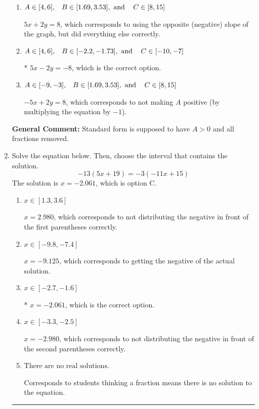 \documentclass{extbook}[14pt]
\newcommand{\litem}[1]{\item #1

\rule{\textwidth}{0.4pt}}
\begin{document}
\begin{enumerate}
{\begin{enumerate}[label=\Alph*.]
 $-2.5x - 1y = -4.0$, which corresponds to using the opposite (negative) slope of the graph and not removing rational values.
\item \( A \in [4, 6], \hspace{3mm} B \in [1.69, 3.53], \text{ and } \hspace{3mm} C \in [8, 15] \)

 $5x + 2y = 8$, which corresponds to using the opposite (negative) slope of the graph, but did everything else correctly.
\item \( A \in [4, 6], \hspace{3mm} B \in [-2.2, -1.73], \text{ and } \hspace{3mm} C \in [-10, -7] \)

* $5x - 2y = -8$, which is the correct option.
\item \( A \in [-9, -3], \hspace{3mm} B \in [1.69, 3.53], \text{ and } \hspace{3mm} C \in [8, 15] \)

 $-5x + 2y = 8$, which corresponds to not making $A$ positive (by multiplying the equation by $-1$).
\end{enumerate}

\textbf{General Comment:} Standard form is supposed to have $A > 0$ and all fractions removed.
}
\litem{
Solve the equation below. Then, choose the interval that contains the solution.
\[ -13(5x + 19) = -3(-11x + 15) \]The solution is \( x = -2.061 \), which is option C.\begin{enumerate}[label=\Alph*.]
\item \( x \in [1.3, 3.6] \)

$x = 2.980$, which corresponds to not distributing the negative in front of the first parentheses correctly.
\item \( x \in [-9.8, -7.4] \)

$x = -9.125$, which corresponds to getting the negative of the actual solution.
\item \( x \in [-2.7, -1.6] \)

* $x = -2.061$, which is the correct option.
\item \( x \in [-3.3, -2.5] \)

$x = -2.980$, which corresponds to not distributing the negative in front of the second parentheses correctly.
\item \( \text{There are no real solutions.} \)

Corresponds to students thinking a fraction means there is no solution to the equation.
\end{enumerate}

}
\end{enumerate}
\end{document}
